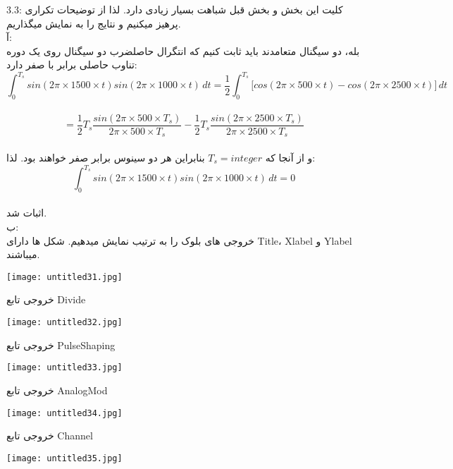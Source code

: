 \large
3.3: 
کلیت این بخش و بخش قبل شباهت بسیار زیادی دارد. لذا از توضیحات تکراری پرهیز میکنیم و نتایج را به نمایش میگذاریم.
\\[1cm]

آ:
\\
بله، دو سیگنال متعامدند
باید ثابت کنیم که انتگرال حاصلضرب دو سیگنال روی یک دوره تناوب حاصلی برابر با صفر دارد:
\\
\[\int_{0}^{{T}_{s}} sin(2\pi\times1500\times t)sin(2\pi\times 1000\times t) \,dt = \frac{1}{2} \int_{0}^{{T}_{s}} {[}cos(2\pi\times500\times t)-cos(2\pi \times2500\times  t){]} \,dt  \]
\\
\[
=\frac{1}{2} {T}_{s} \frac{sin(2\pi\times 500\times {T}_{s})}{2\pi\times 500\times {T}_{s}} - \frac{1}{2} {T}_{s} \frac{sin(2\pi\times 2500\times {T}_{s})}{2\pi\times 2500\times {T}_{s}} \]
\\
و از آنجا که ${T}_{s} = integer$ بنابراین هر دو سینوس برابر صفر خواهند بود. لذا:
\\
\[\int_{0}^{{T}_{s}} sin(2\pi\times1500\times t)sin(2\pi\times 1000\times t) \,dt = 0\]
\\
اثبات شد.
\\[0.5cm]

ب:
\\
خروجی های بلوک را به ترتیب نمایش میدهیم. شکل ها دارای Title، Xlabel و Ylabel میباشند.

\begin{center}
    \texttt{[image: untitled31.jpg]}
\end{center}

\centering
خروجی تابع Divide


\begin{center}
    \texttt{[image: untitled32.jpg]}
\end{center}

\centering
خروجی تابع PulseShaping


\begin{center}
    \texttt{[image: untitled33.jpg]}
\end{center}

\centering
خروجی تابع AnalogMod
 

\begin{center}
    \texttt{[image: untitled34.jpg]}
\end{center}

\centering
خروجی تابع Channel
 

\begin{center}
    \texttt{[image: untitled35.jpg]}
\end{center}

